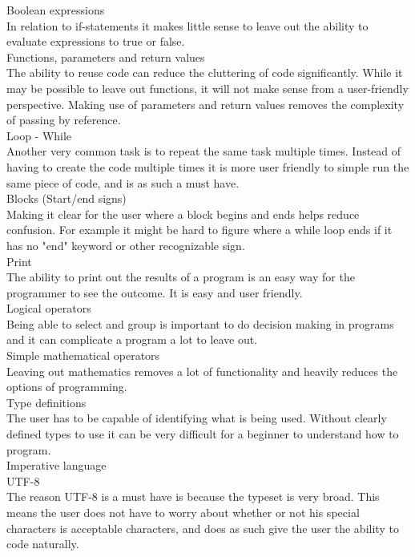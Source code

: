 Boolean expressions \\
In relation to if-statements it makes little sense to leave out the ability to evaluate expressions to true or false. \\

Functions, parameters and return values \\
The ability to reuse code can reduce the cluttering of code significantly. While it may be possible to leave out functions, it will not make sense from a user-friendly perspective. Making use of parameters and return values removes the complexity of passing by reference. \\

Loop - While \\
Another very common task is to repeat the same task multiple times. Instead of having to create the code multiple times it is more user friendly to simple run the same piece of code, and is as such a must have. \\

Blocks (Start/end signs) \\
Making it clear for the user where a block begins and ends helps reduce confusion. For example it might be hard to figure where a while loop ends if it has no "end" keyword or other recognizable sign. \\

Print \\
The ability to print out the results of a program is an easy way for the programmer to see the outcome. It is easy and user friendly. \\

Logical operators \\
Being able to select and group is important to do decision making in programs and it can complicate a program a lot to leave out. \\

Simple mathematical operators \\
Leaving out mathematics removes a lot of functionality and heavily reduces the options of programming. \\

Type definitions \\
The user has to be capable of identifying what is being used. Without clearly defined types to use it can be very difficult for a beginner to understand how to program. \\

Imperative language \\

UTF-8 \\
The reason UTF-8 is a must have is because the typeset is very broad. This means the user does not have to worry about whether or not his special characters is acceptable characters, and does as such give the user the ability to code naturally.